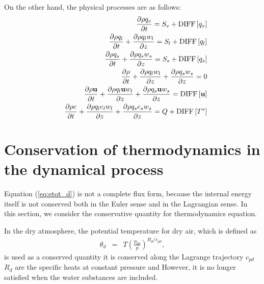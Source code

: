 On the other hand, 
the physical processes are as follows:
\begin{eqnarray}
&&  \frac{\partial \rho q_v}{\partial t}  = S_v
+{\rm DIFF}\left[q_v \right]
\label{eq:rho_v_p}\\
&&  \frac{\partial \rho q_l}{\partial t}
+ \frac{\partial \rho q_l w_l}{\partial z}=S_l
+{\rm DIFF}\left[q_l \right]
\label{eq:rho_l_p}\\
&&  \frac{\partial \rho q_s}{\partial t}
+ \frac{\partial \rho q_s w_s}{\partial z}=S_s
+{\rm DIFF}\left[q_s \right]
\label{eq:rho_s_p}\\
&&  \frac{\partial \rho}{\partial t}
+ \frac{\partial \rho q_l w_l}{\partial z}
+ \frac{\partial \rho q_s w_s}{\partial z}
=0 \label{eq:rhotot_p}\\
&&  \frac{\partial \rho {\bf u}}{\partial t}
+ \frac{\partial \rho q_l {\bf u} w_l}{\partial z}
+ \frac{\partial \rho q_s {\bf u} w_s}{\partial z}
= {\rm DIFF}\left[{\bf u} \right] 
 \label{eq:momtot_p}\\
&&  \frac{\partial \rho e  }{\partial t}
+ \frac{\partial \rho q_l e_l w_l}{\partial z}
 + \frac{\partial \rho q_s e_s w_s}{\partial z}
=  Q + {\rm DIFF}\left[T^{*} \right] \label{eq:etot_p}
\end{eqnarray}

\section{Conservation of thermodynamics in the dynamical process}

Equation (\ref{eq:etot_d}) is not a complete flux form,
because the internal energy itself is not conserved
both in the Euler sense and in the Lagrangian sense.
In this section, we consider the conservative 
quantity for thermodynamics equation.

In the dry atmosphere, the potential temperature for dry air,
which is defined as
\begin{eqnarray}
\theta_d &=& T \left(\frac{p_{00}}{p}\right)^{R_d/c_{pd}},
\end{eqnarray}
is used as a conserved quantity it is conserved along the Lagrange trajectory
$c_{pd}$ $R_d$ are the specific heats at constant pressure and
However, it is no longer satisfied when the water substances are included.

